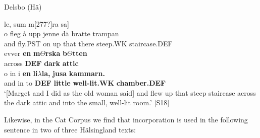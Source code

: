 
\item 

Delsbo (Hä)



 \ea\label{}
\gll [Marget o j$\Theta $ j[277?]le, sum m[277?]ra sa]\\

 \ea\label{}
\gll o  fleg  å  upp  jenne  dä  bratte  trampan\\


and  fly.PST  on  up  that  there  steep.WK  staircase.DEF\\

 \ea\label{}
\gll evver  \textbf{en} \textbf{m}\textbf{$\Theta $}\textbf{rska} \textbf{b}\textbf{$\Theta $}\textbf{tten}\\


across  \textbf{DEF} \textbf{dark} \textbf{attic}\\

 \ea\label{}
\gll o  in  i  \textbf{en}\textbf{  li}\textbf{$\lambda $}\textbf{la,}\textbf{  jusa}\textbf{  kammarn.}\\


and  in  to   \textbf{DEF} \textbf{little} \textbf{well-lit.WK} \textbf{chamber.DEF}\\

\glt ‘[Marget and I did as the old woman said] and flew up that steep staircase across the dark attic and into the small, well-lit room.’ [S18]

\z

Likewise, in the Cat Corpus we find that incorporation is used in the following sentence in two of three Hälsingland texts:


\item 


\item 

